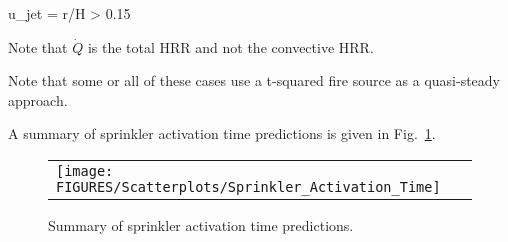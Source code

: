 \be
u_{jet} =   r/H > 0.15
\ee

\noindent Note that $\dot Q$ is the total HRR and not the convective HRR.

\noindent Note that some or all of these cases use a t-squared fire source as a quasi-steady approach.

\clearpage

A summary of sprinkler activation time predictions is given in Fig.~\ref{sprinkler_activation_summary}. 

\begin{figure}[ht]
\begin{center}
\begin{tabular}{l}
\texttt{[image: FIGURES/Scatterplots/Sprinkler\_Activation\_Time]}
\end{tabular}
\end{center}
\caption[Summary of sprinkler activation time predictions.]
{Summary of sprinkler activation time predictions.}
\label{sprinkler_activation_summary}
\end{figure}

